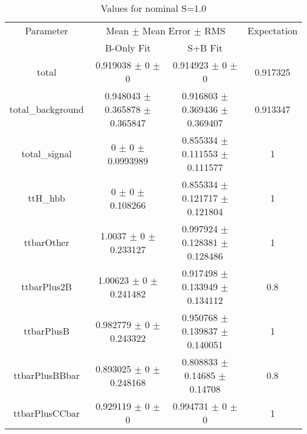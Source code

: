 \begin{table}
\centering
\caption{Values for nominal S=1.0}
\begin{tabular}{cccc}
\toprule
Parameter & \multicolumn{2}{c}{Mean $\pm$ Mean Error $\pm$ RMS} & Expectation\\
 & B-Only Fit & S+B Fit & \\
\midrule
total & \num{0.919038} $\pm$ \num{0} $\pm$ \num{0} & \num{0.914923} $\pm$ \num{0} $\pm$ \num{0} & \num{0.917325}\\
total\_background & \num{0.948043} $\pm$ \num{0.365878} $\pm$ \num{0.365847} & \num{0.916803} $\pm$ \num{0.369436} $\pm$ \num{0.369407} & \num{0.913347}\\
total\_signal & \num{0} $\pm$ \num{0} $\pm$ \num{0.0993989} & \num{0.855334} $\pm$ \num{0.111553} $\pm$ \num{0.111577} & \num{1}\\
ttH\_hbb & \num{0} $\pm$ \num{0} $\pm$ \num{0.108266} & \num{0.855334} $\pm$ \num{0.121717} $\pm$ \num{0.121804} & \num{1}\\
ttbarOther & \num{1.0037} $\pm$ \num{0} $\pm$ \num{0.233127} & \num{0.997924} $\pm$ \num{0.128381} $\pm$ \num{0.128486} & \num{1}\\
ttbarPlus2B & \num{1.00623} $\pm$ \num{0} $\pm$ \num{0.241482} & \num{0.917498} $\pm$ \num{0.133949} $\pm$ \num{0.134112} & \num{0.8}\\
ttbarPlusB & \num{0.982779} $\pm$ \num{0} $\pm$ \num{0.243322} & \num{0.950768} $\pm$ \num{0.139837} $\pm$ \num{0.140051} & \num{1}\\
ttbarPlusBBbar & \num{0.893025} $\pm$ \num{0} $\pm$ \num{0.248168} & \num{0.808833} $\pm$ \num{0.14685} $\pm$ \num{0.14708} & \num{0.8}\\
ttbarPlusCCbar & \num{0.929119} $\pm$ \num{0} $\pm$ \num{0} & \num{0.994731} $\pm$ \num{0} $\pm$ \num{0} & \num{1}\\
\bottomrule
\end{tabular}
\end{table}